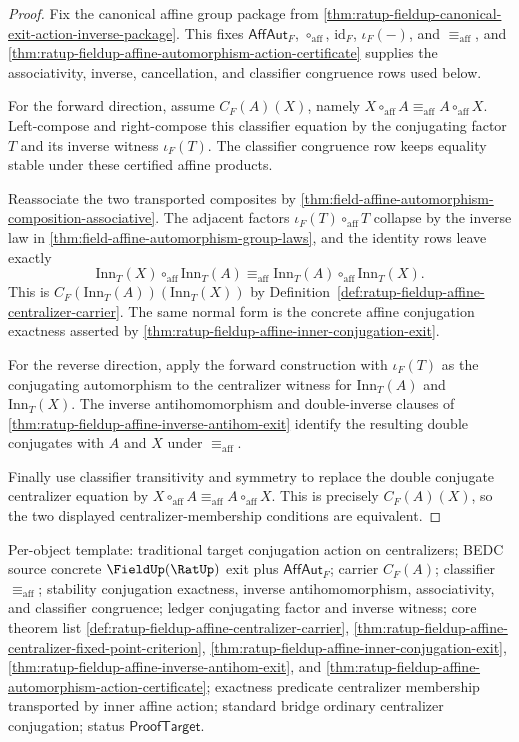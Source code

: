 \begin{proof}
Fix the canonical affine group package from
\autoref{thm:ratup-fieldup-canonical-exit-action-inverse-package}. This fixes
$\mathsf{AffAut}_F$, $\circ_{\mathrm{aff}}$, $\mathrm{id}_F$, $\iota_F(-)$,
and $\equiv_{\mathrm{aff}}$, and
\autoref{thm:ratup-fieldup-affine-automorphism-action-certificate} supplies
the associativity, inverse, cancellation, and classifier congruence rows used
below.

For the forward direction, assume $C_F(A)(X)$, namely
$X\circ_{\mathrm{aff}}A\equiv_{\mathrm{aff}}A\circ_{\mathrm{aff}}X$.
Left-compose and right-compose this classifier equation by the conjugating
factor $T$ and its inverse witness $\iota_F(T)$. The classifier congruence row
keeps equality stable under these certified affine products.

Reassociate the two transported composites by
\autoref{thm:field-affine-automorphism-composition-associative}. The adjacent
factors $\iota_F(T)\circ_{\mathrm{aff}}T$ collapse by the inverse law in
\autoref{thm:field-affine-automorphism-group-laws}, and the identity rows
leave exactly
$$
\mathrm{Inn}_T(X)\circ_{\mathrm{aff}}\mathrm{Inn}_T(A)
\equiv_{\mathrm{aff}}
\mathrm{Inn}_T(A)\circ_{\mathrm{aff}}\mathrm{Inn}_T(X).
$$
This is $C_F(\mathrm{Inn}_T(A))(\mathrm{Inn}_T(X))$ by
Definition~\ref{def:ratup-fieldup-affine-centralizer-carrier}. The same
normal form is the concrete affine conjugation exactness asserted by
\autoref{thm:ratup-fieldup-affine-inner-conjugation-exit}.

For the reverse direction, apply the forward construction with
$\iota_F(T)$ as the conjugating automorphism to the centralizer witness for
$\mathrm{Inn}_T(A)$ and $\mathrm{Inn}_T(X)$. The inverse antihomomorphism and
double-inverse clauses of
\autoref{thm:ratup-fieldup-affine-inverse-antihom-exit} identify the resulting
double conjugates with $A$ and $X$ under $\equiv_{\mathrm{aff}}$.

Finally use classifier transitivity and symmetry to replace the double
conjugate centralizer equation by
$X\circ_{\mathrm{aff}}A\equiv_{\mathrm{aff}}A\circ_{\mathrm{aff}}X$. This is
precisely $C_F(A)(X)$, so the two displayed centralizer-membership conditions
are equivalent.
\end{proof}

Per-object template: traditional target conjugation action on centralizers;
BEDC source concrete $\FieldUp(\RatUp)$ exit plus $\mathsf{AffAut}_F$; carrier
$C_F(A)$; classifier $\equiv_{\mathrm{aff}}$; stability conjugation exactness,
inverse antihomomorphism, associativity, and classifier congruence; ledger
conjugating factor and inverse witness; core theorem list
\autoref{def:ratup-fieldup-affine-centralizer-carrier},
\autoref{thm:ratup-fieldup-affine-centralizer-fixed-point-criterion},
\autoref{thm:ratup-fieldup-affine-inner-conjugation-exit},
\autoref{thm:ratup-fieldup-affine-inverse-antihom-exit}, and
\autoref{thm:ratup-fieldup-affine-automorphism-action-certificate}; exactness
predicate centralizer membership transported by inner affine action; standard
bridge ordinary centralizer conjugation; status $\mathsf{ProofTarget}$.


